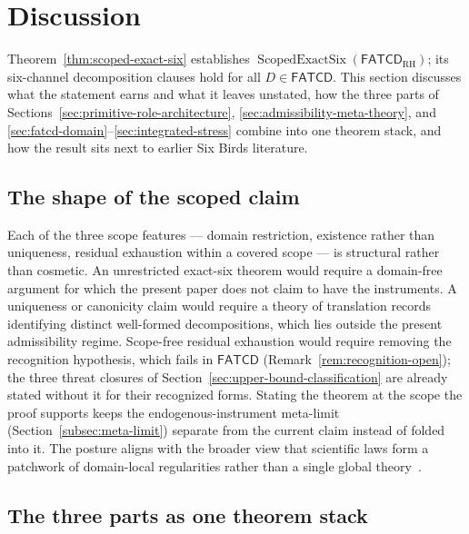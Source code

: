 \documentclass[11pt]{article}
\theoremstyle{definition}
\newcommand{\FATCD}{\ensuremath{\mathsf{FATCD}}}
\newcommand{\ScopedExactSix}[1]{\ensuremath{\operatorname{ScopedExactSix}\!\left(#1\right)}}
\begin{document}
 \section{Discussion}\label{sec:discussion}


Theorem~\ref{thm:scoped-exact-six} establishes
\(\ScopedExactSix{\FATCD_{\mathrm{RH}}}\); its six-channel decomposition
clauses hold for all \(D\in\FATCD{}\).
This section discusses what the statement earns and what it leaves
unstated, how the three parts of
Sections~\ref{sec:primitive-role-architecture},
\ref{sec:admissibility-meta-theory}, and
\ref{sec:fatcd-domain}--\ref{sec:integrated-stress} combine into one
theorem stack, and how the result sits next to earlier Six Birds
literature.

\subsection{The shape of the scoped claim}\label{subsec:discussion-shape}

Each of the three scope features --- domain restriction, existence
rather than uniqueness, residual exhaustion within a covered scope
--- is structural rather than cosmetic. An unrestricted exact-six
theorem would require a domain-free argument for which the present
paper does not claim to have the instruments. A uniqueness or
canonicity claim would require a theory of translation records
identifying distinct well-formed decompositions, which lies outside
the present admissibility regime. Scope-free residual exhaustion
would require removing the recognition hypothesis, which fails in
\FATCD{} (Remark~\ref{rem:recognition-open}); the three threat closures of
Section~\ref{sec:upper-bound-classification} are already stated without it
for their recognized forms. Stating
the theorem at the scope the proof supports keeps the
endogenous-instrument meta-limit (Section~\ref{subsec:meta-limit})
separate from the current claim instead of folded into it. The posture
aligns with the broader view that scientific laws form a patchwork of
domain-local regularities rather than a single global
theory~\citep{Cartwright1999}.

\subsection{The three parts as one theorem stack}\label{subsec:discussion-pillars}
\end{document}

